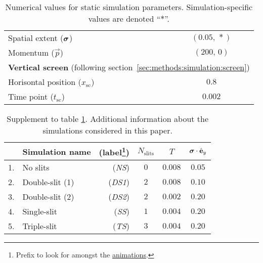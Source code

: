 \begin{table}[ht!]
\begin{tabular}{l|c}
                Spatial extent ($\boldsymbol{\sigma}$)        & $(0.05, \,*)$             \\
                Momentum ($\vec{p}$)                    & $(200,\, 0)$              \\
                \hline
                \multicolumn{2}{l}{\textbf{Vertical screen} (following section~\ref{sec:methods:simulation:screen})} \\
                \hline
                Horisontal position ($x_\mathrm{sc}$)   & $0.8$     \\
                Time point ($t_\mathrm{sc}$)            & $0.002$   \\
                \hline
            \end{tabular}
            \caption{Numerical values for static simulation parameters. Simulation-specific values are denoted ``$*$''.}
            \label{tab:simulation_parameters}
        \end{table}



        \begin{table}[ht!]
            \centering
            \begin{tabular}{clr|ccc}
                \hline
                & Simulation name & (label\footnote{Prefix to look for amongst the \href{\animlink}{animations}.}) & $N_\mathrm{slits}$ & $T$ & $\boldsymbol{\sigma}\cdot \hat{\mathbf{e}}_y$ \\
                \hline
                1. & No slits        & (\textit{NS})   & $0$   & $0.008$   & $0.05$ \\
                2. & Double-slit (1) & (\textit{DS1})  & $2$   & $0.008$   & $0.10$ \\
                3. & Double-slit (2) & (\textit{DS2})  & $2$   & $0.002$   & $0.20$ \\
                4. & Single-slit     & (\textit{SS})   & $1$   & $0.004$   & $0.20$ \\
                5. & Triple-slit     & (\textit{TS})   & $3$   & $0.004$   & $0.20$ \\
                \hline
            \end{tabular}
            \caption{Supplement to table \ref{tab:simulation_parameters}. Additional information about the simulations considered in this paper.}
            \label{tab:simulations_info}
        \end{table}


